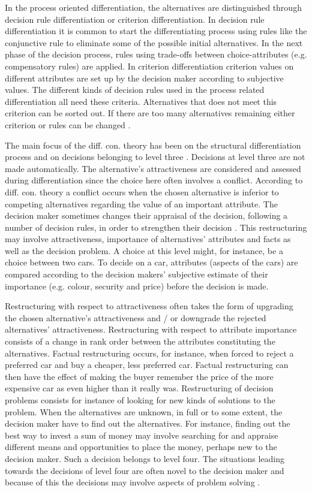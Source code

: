 In the process oriented differentiation, the alternatives are
distinguished through decision rule differentiation or criterion
differentiation.  In decision rule differentiation it is common to
start the differentiating process using rules like the conjunctive
rule to eliminate some of the possible initial alternatives.  In the
next phase of the decision process, rules using trade-offs between
choice-attributes (e.g. compensatory rules) are applied.  In criterion
differentiation criterion values on different attributes are set up by
the decision maker according to subjective values.  The different
kinds of decision rules used in the process related differentiation
all need these criteria.  Alternatives that does not meet this
criterion can be sorted out.  If there are too many alternatives
remaining either criterion or rules can be changed \parencite{Svensson96}.

 The main focus of the diff. con. theory has been on the structural
 differentiation process and on decisions belonging to level three .
 Decisions at level three are not made automatically. The
 alternative's attractiveness are considered and assessed during
 differentiation since the choice here often involves a conflict.
 According to diff. con. theory a conflict occurs when the chosen
 alternative is inferior to competing alternatives regarding the value
 of an important attribute.  The decision maker sometimes changes
 their appraisal of the decision, following a number of decision
 rules, in order to strengthen their decision \parencite{Svensson95}.
 This restructuring may involve attractiveness, importance of
 alternatives' attributes and facts as well as the decision problem.
 A choice at this level might, for instance, be a choice between two
 cars.  To decide on a car, attributes (aspects of the cars) are
 compared according to the decision makers' subjective estimate of
 their importance (e.g. colour, security and price) before the
 decision is made.

 Restructuring with respect to attractiveness often takes the form of
 upgrading the chosen alternative's attractiveness and / or downgrade
 the rejected alternatives' attractiveness.  Restructuring with
 respect to attribute importance consists of a change in rank order
 between the attributes constituting the alternatives.  Factual
 restructuring occurs, for instance, when forced to reject a preferred
 car and buy a cheaper, less preferred car.  Factual restructuring can
 then have the effect of making the buyer remember the price of the
 more expensive car as even higher than it really was.  Restructuring
 of decision problems consists for instance of looking for new kinds
 of solutions to the problem.  When the alternatives are unknown, in
 full or to some extent, the decision maker have to find out the
 alternatives.  For instance, finding out the best way to invest a sum
 of money may involve searching for and appraise different means and
 opportunities to place the money, perhaps new to the decision maker.
 Such a decision belongs to level four.  The situations leading
 towards the decisions of level four are often novel to the decision
 maker and because of this the decisions may involve aspects of
 problem solving \parencite{svensson92b}.



